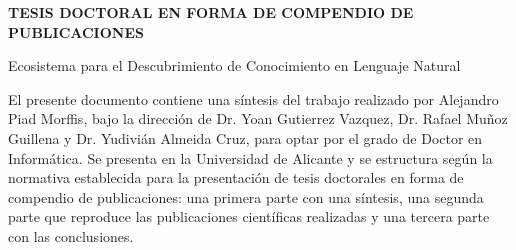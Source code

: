 {
\center

\Large{\bf TESIS DOCTORAL EN FORMA DE COMPENDIO DE PUBLICACIONES} 
\BlankLine

Ecosistema para el Descubrimiento de Conocimiento en Lenguaje Natural
\BlankLine
}

El presente documento contiene una síntesis del trabajo realizado por Alejandro Piad Morffis, bajo la dirección de Dr. Yoan Gutierrez Vazquez, Dr. Rafael Muñoz Guillena y Dr. Yudivián Almeida Cruz, para optar por el grado de Doctor en Informática. Se presenta en la Universidad de Alicante y se estructura según
la normativa establecida para la presentación de tesis doctorales en forma de compendio de publicaciones: una primera parte con una síntesis, una segunda parte que reproduce las publicaciones científicas realizadas y una tercera parte con las conclusiones.
